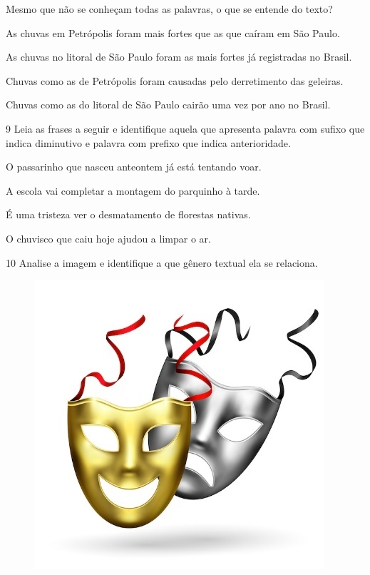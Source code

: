 Mesmo que não se conheçam todas as palavras, o que se entende do texto?

\begin{escolha}
\item As chuvas em Petrópolis foram mais fortes que as que caíram em São Paulo.

\item As chuvas no litoral de São Paulo foram as mais fortes já registradas no Brasil.

\item Chuvas como as de Petrópolis foram causadas pelo derretimento das geleiras.

\item Chuvas como as do litoral de São Paulo cairão uma vez por ano no Brasil.
\end{escolha}

\num{9} Leia as frases a seguir e identifique aquela que apresenta palavra
com sufixo que indica diminutivo e palavra com prefixo que indica
anterioridade.

\begin{escolha}
\item O passarinho que nasceu anteontem já está tentando voar.

\item A escola vai completar a montagem do parquinho à tarde.

\item É uma tristeza ver o desmatamento de florestas nativas.

\item O chuvisco que caiu hoje ajudou a limpar o ar.
\end{escolha}


\num{10} Analise a imagem e identifique a que gênero textual ela se relaciona.

\begin{figure}[htpb!]
\centering
\includegraphics[width=.5\textwidth]{./media/simulados/image1.jpeg}
\end{figure}

